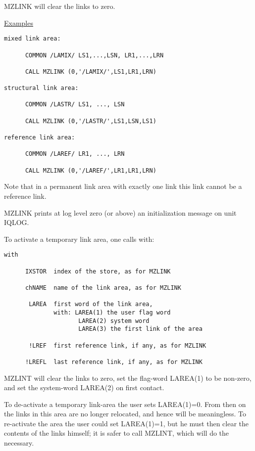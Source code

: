 MZLINK will clear the links to zero.

\ul{Examples}
\begin{verbatim}
mixed link area:

      COMMON /LAMIX/ LS1,...,LSN, LR1,...,LRN

      CALL MZLINK (0,'/LAMIX/',LS1,LR1,LRN)

structural link area:

      COMMON /LASTR/ LS1, ..., LSN

      CALL MZLINK (0,'/LASTR/',LS1,LSN,LS1)

reference link area:

      COMMON /LAREF/ LR1, ..., LRN

      CALL MZLINK (0,'/LAREF/',LR1,LR1,LRN)
\end{verbatim} 
Note that in a permanent link area with exactly one link
this link cannot be a reference link.

MZLINK prints at log level zero (or above) an initialization
message on unit IQLOG.

To activate a temporary link area, one calls with:

\begin{verbatim}
with

      IXSTOR  index of the store, as for MZLINK

      chNAME  name of the link area, as for MZLINK

       LAREA  first word of the link area,
              with: LAREA(1) the user flag word
                     LAREA(2) system word
                     LAREA(3) the first link of the area

       !LREF  first reference link, if any, as for MZLINK

      !LREFL  last reference link, if any, as for MZLINK
\end{verbatim} 

MZLINT will clear the links to zero,
set the flag-word LAREA(1) to be non-zero,
and set the system-word LAREA(2) on first contact.

To de-activate a temporary link-area the user sets LAREA(1)=0.
From then on the links in this area are no longer relocated,
and hence will be meaningless.
To re-activate the area the user could set LAREA(1)=1,
but he must then clear the contents of the links himself;
it is safer to call MZLINT, which will do the necessary.

